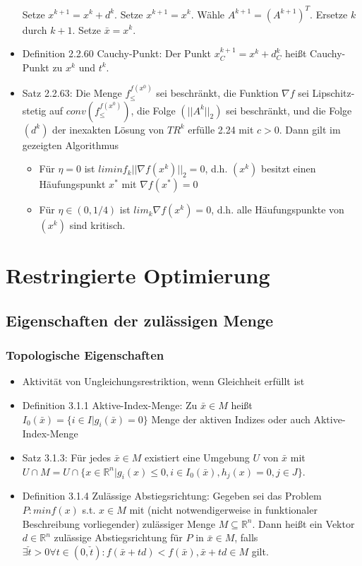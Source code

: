 \documentclass[paper=a4, fontsize=11pt]{scrartcl} %
\numberwithin{equation}{section} %
\numberwithin{figure}{section} %
\numberwithin{table}{section} %
\begin{document}
\begin{itemize}
\begin{algorithm}
\begin{algorithmic}[1]
    \State Setze $x^{k+1} = x^k + d^k$.
    \Else
    \State Setze $x^{k+1} = x^k$.
    \EndIf
    \State Wähle $A^{k+1} = (A^{k+1})^T$.
    \State Ersetze $k$ durch $k+1$.
    \EndWhile
    \State Setze $\bar{x} = x^k$.
  \end{algorithmic}
  \end{algorithm}
  \item Definition 2.2.60 Cauchy-Punkt: Der Punkt $x_C^{k+1} = x^k + d_C^k$ heißt Cauchy-Punkt zu $x^k$ und $t^k$.
  \item Satz 2.2.63: Die Menge $f_\le^{f(x^0)}$ sei beschränkt, die Funktion $\nabla f$ sei Lipschitz-stetig auf $conv(f_\le^{f(x^0)})$, die Folge $(||A^k||_2)$ sei beschränkt, und die Folge $(d^k)$ der inexakten Lösung von $TR^k$ erfülle 2.24 mit $c > 0$. Dann gilt im gezeigten Algorithmus
  \begin{itemize}
    \item Für $\eta = 0$ ist $lim inf_k ||\nabla f(x^k)||_2 = 0$, d.h. $(x^k)$ besitzt einen Häufungspunkt $x^*$ mit $\nabla f(x^*) = 0$
    \item Für $\eta \in (0,1/4)$ ist $lim_k \nabla f(x^k) = 0$, d.h. alle Häufungspunkte von $(x^k)$ sind kritisch.
  \end{itemize}
\end{itemize}

\section{Restringierte Optimierung}

\subsection{Eigenschaften der zulässigen Menge}

\subsubsection{Topologische Eigenschaften}

\begin{itemize}
  \item Aktivität von Ungleichungsrestriktion, wenn Gleichheit erfüllt ist
  \item Definition 3.1.1 Aktive-Index-Menge: Zu $\bar{x} \in M$ heißt $I_0(\bar{x}) = \{ i \in I | g_i(\bar{x}) = 0\}$ Menge der aktiven Indizes oder auch Aktive-Index-Menge
  \item Satz 3.1.3: Für jedes $\bar{x} \in M$ existiert eine Umgebung $U$ von $\bar{x}$ mit $U \cap M = U \cap \{ x \in \mathbb{R}^n | g_i(x) \le 0, i \in I_0(\bar{x}), h_j(x) = 0, j \in J\}$.
  \item Definition 3.1.4 Zulässige Abstiegsrichtung: Gegeben sei das Problem $P: min f(x)$ s.t. $x \in M$ mit (nicht notwendigerweise in funktionaler Beschreibung vorliegender) zulässiger Menge $M \subseteq \mathbb{R}^n$. Dann heißt ein Vektor $d \in \mathbb{R}^n$ zulässige Abstiegsrichtung für $P$ in $\bar{x} \in M$, falls $\exists \check{t} > 0 \forall t \in (0,\check{t}): f(\bar{x}+td) < f(\bar{x}), \bar{x} + t d \in M$ gilt.
\end{itemize}
\end{document}
